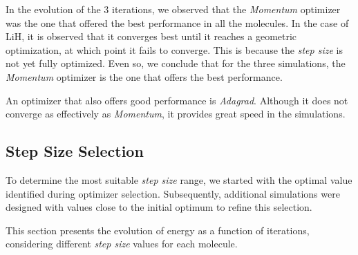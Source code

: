 In the evolution of the 3 iterations, we observed that the \textit{Momentum} optimizer was the one that offered the best performance in all the molecules. In the case of LiH, it is observed that it converges best until it reaches a geometric optimization, at which point it fails to converge. This is because the \emph{step size} is not yet fully optimized. Even so, we conclude that for the three simulations, the \textit{Momentum} optimizer is the one that offers the best performance.

An optimizer that also offers good performance is \textit{Adagrad}. Although it does not converge as effectively as \textit{Momentum}, it provides great speed in the simulations.

\newpage
\subsection{Step Size Selection}
To determine the most suitable \textit{step size} range, we started with the optimal value identified during optimizer selection. Subsequently, additional simulations were designed with values close to the initial optimum to refine this selection. 

This section presents the evolution of energy as a function of iterations, considering different \textit{step size} values for each molecule.

